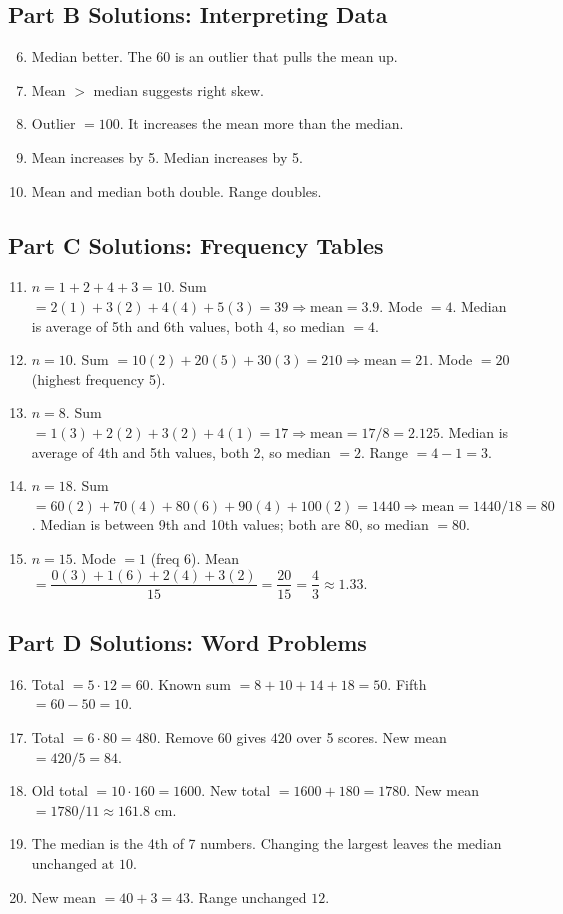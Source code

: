 \documentclass[14pt]{extarticle}
\begin{document}
\subsection*{Part B Solutions: Interpreting Data}
\begin{enumerate}
  \setcounter{enumi}{5}
  \item Median better. The 60 is an outlier that pulls the mean up.
  \item Mean \(>\) median suggests right skew.
  \item Outlier \(=100\). It increases the mean more than the median.
  \item Mean increases by 5. Median increases by 5.
  \item Mean and median both double. Range doubles.
\end{enumerate}

\subsection*{Part C Solutions: Frequency Tables}
\begin{enumerate}
  \setcounter{enumi}{10}
  \item \(n=1+2+4+3=10\). Sum \(=2(1)+3(2)+4(4)+5(3)=39\Rightarrow \text{mean}=3.9\). Mode \(=4\). Median is average of 5th and 6th values, both 4, so median \(=4\).
  \item \(n=10\). Sum \(=10(2)+20(5)+30(3)=210\Rightarrow \text{mean}=21\). Mode \(=20\) (highest frequency 5).
  \item \(n=8\). Sum \(=1(3)+2(2)+3(2)+4(1)=17\Rightarrow \text{mean}=17/8=2.125\). Median is average of 4th and 5th values, both 2, so median \(=2\). Range \(=4-1=3\).
  \item \(n=18\). Sum \(=60(2)+70(4)+80(6)+90(4)+100(2)=1440\Rightarrow \text{mean}=1440/18=80\). Median is between 9th and 10th values; both are 80, so median \(=80\).
  \item \(n=15\). Mode \(=1\) (freq 6). Mean \(=\dfrac{0(3)+1(6)+2(4)+3(2)}{15}=\dfrac{20}{15}=\dfrac{4}{3}\approx1.33\).
\end{enumerate}

\subsection*{Part D Solutions: Word Problems}
\begin{enumerate}
  \setcounter{enumi}{15}
  \item Total \(=5\cdot12=60\). Known sum \(=8+10+14+18=50\). Fifth \(=60-50=\boxed{10}\).
  \item Total \(=6\cdot80=480\). Remove 60 gives \(420\) over 5 scores. New mean \(=420/5=\boxed{84}\).
  \item Old total \(=10\cdot160=1600\). New total \(=1600+180=1780\). New mean \(=1780/11\approx\boxed{161.8\text{ cm}}\).
  \item The median is the 4th of 7 numbers. Changing the largest leaves the median \(\boxed{\text{unchanged at }10}\).
  \item New mean \(=40+3=\boxed{43}\). Range unchanged \(\boxed{12}\).
\end{enumerate}
\end{document}
